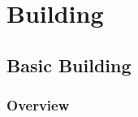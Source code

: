 \documentclass[dvips]{book}
\begin{document}
\chapter{Building}
\section{Basic Building}
\subsection{Overview}
\backmatter
\end{document}
